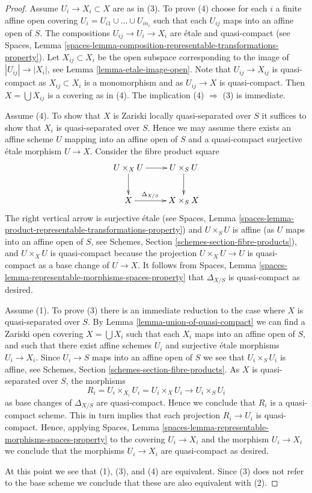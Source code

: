 \documentclass{stacks-project}
\theoremstyle{plain}
\theoremstyle{definition}
\theoremstyle{remark}
\numberwithin{equation}{subsection}
\begin{document}
\begin{proof}
Assume  $U_i \to X_i \subset X$ are as in (3). To prove (4)
choose for each $i$ a finite affine open covering $U_i =
U_{i1} \cup \ldots \cup U_{in_i}$ such that each $U_{ij}$ maps
into an affine open of $S$. The compositions
$U_{ij} \to U_i \to X_i$ are \'etale and quasi-compact (see
Spaces, Lemma
\ref{spaces-lemma-composition-representable-transformations-property}).
Let $X_{ij} \subset X_i$ be the open subspace corresponding to
the image of $|U_{ij}| \to |X_i|$, see
Lemma \ref{lemma-etale-image-open}.
Note that $U_{ij} \to X_{ij}$ is quasi-compact as $X_{ij} \subset X_i$
is a monomorphism and as $U_{ij} \to X$ is quasi-compact.
Then $X = \bigcup X_{ij}$ is a covering as in (4).
The implication (4) $\Rightarrow$ (3) is immediate.

\medskip\noindent
Assume (4). To show that $X$ is Zariski locally quasi-separated over $S$
it suffices to show that $X_i$ is quasi-separated over $S$.
Hence we may assume there exists an affine scheme $U$ mapping into
an affine open of $S$ and a quasi-compact surjective \'etale
morphism $U \to X$. Consider the fibre product square
$$
\xymatrix{
U \times_X U \ar[r] \ar[d] & U \times_S U \ar[d] \\
X \ar[r]^-{\Delta_{X/S}} & X \times_S X
}
$$
The right vertical arrow is surjective \'etale (see
Spaces, Lemma
\ref{spaces-lemma-product-representable-transformations-property})
and $U \times_S U$ is affine (as $U$ maps into an affine open of $S$, see
Schemes, Section \ref{schemes-section-fibre-products}),
and $U \times_X U$ is quasi-compact
because the projection $U \times_X U \to U$ is quasi-compact as a
base change of $U \to X$. It follows from
Spaces, Lemma \ref{spaces-lemma-representable-morphisms-spaces-property}
that $\Delta_{X/S}$ is quasi-compact as desired.

\medskip\noindent
Assume (1). To prove (3) there is an immediate reduction to the case
where $X$ is quasi-separated over $S$. By
Lemma \ref{lemma-union-of-quasi-compact}
we can find a Zariski open covering $X = \bigcup X_i$ such that each
$X_i$ maps into an affine open of $S$, and such that there exist affine
schemes $U_i$ and surjective \'etale morphisms $U_i \to X_i$.
Since $U_i \to S$ maps into an affine open of $S$ we see that
$U_i \times_S U_i$ is affine, see
Schemes, Section \ref{schemes-section-fibre-products}.
As $X$ is quasi-separated over $S$, the morphisms
$$
R_i = U_i \times_{X_i} U_i = U_i \times_X U_i
\longrightarrow
U_i \times_S U_i
$$
as base changes of $\Delta_{X/S}$ are quasi-compact. Hence we conclude
that $R_i$ is a quasi-compact scheme. This in turn implies that each
projection $R_i \to U_i$ is quasi-compact. Hence, applying
Spaces, Lemma \ref{spaces-lemma-representable-morphisms-spaces-property}
to the covering $U_i \to X_i$ and the morphism $U_i \to X_i$
we conclude that the morphisms $U_i \to X_i$ are quasi-compact as desired.

\medskip\noindent
At this point we see that (1), (3), and (4) are equivalent. Since (3) does
not refer to the base scheme we conclude that these are also equivalent
with (2).
\end{proof}
\end{document}
